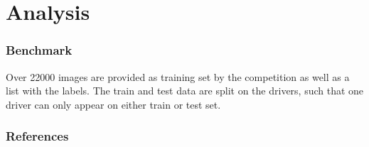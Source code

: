 \documentclass{beamer}
\begin{document}
	\section{Analysis}	
	\begin{frame}
		\frametitle{Benchmark}
		Over 22000 images are provided as training set by the competition as well as a list with the labels. The train and test data are split on the drivers, such that one driver can only appear on either train or test set. 		


	\end{frame}

		
		


		
		\begin{frame}[allowframebreaks]
			\frametitle{References} 
			\nocite{*} 
			 
			 
		\end{frame}
		
		\medskip	
		

	
		
\end{document}
